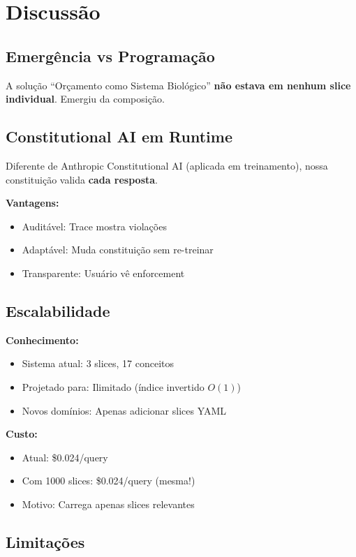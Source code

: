 \documentclass[11pt]{article}
\begin{document}
\section{Discussão}

\subsection{Emergência vs Programação}

A solução ``Orçamento como Sistema Biológico'' \textbf{não estava em nenhum slice individual}. Emergiu da composição.

\subsection{Constitutional AI em Runtime}

Diferente de Anthropic Constitutional AI (aplicada em treinamento), nossa constituição valida \textbf{cada resposta}.

\textbf{Vantagens:}
\begin{itemize}
    \item Auditável: Trace mostra violações
    \item Adaptável: Muda constituição sem re-treinar
    \item Transparente: Usuário vê enforcement
\end{itemize}

\subsection{Escalabilidade}

\textbf{Conhecimento:}
\begin{itemize}
    \item Sistema atual: 3 slices, 17 conceitos
    \item Projetado para: Ilimitado (índice invertido $O(1)$)
    \item Novos domínios: Apenas adicionar slices YAML
\end{itemize}

\textbf{Custo:}
\begin{itemize}
    \item Atual: \$0.024/query
    \item Com 1000 slices: \$0.024/query (mesma!)
    \item Motivo: Carrega apenas slices relevantes
\end{itemize}

\subsection{Limitações}
\end{document}
